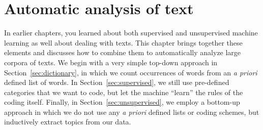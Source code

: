 \chapter{ Automatic analysis of text}
\label{chap:text}

In earlier chapters, you learned about both supervised and unsupervised machine learning as well about dealing with texts.
This chapter brings together these elements and discusses how to combine them to automatically analyze large corpora of texts. We begin with a very simple top-down approach in Section~\ref{sec:dictionary}, in which we count occurrences of words from an \emph{a priori} defined list of words. In Section~\ref{sec:supervised}, we still use pre-defined categories that we want to code, but let the machine ``learn'' the rules of the coding itself. Finally, in Section~\ref{sec:unsupervised}, we employ a bottom-up approach in which we do not use any \emph{a priori} defined lists or coding schemes, but inductively extract topics from our data.








